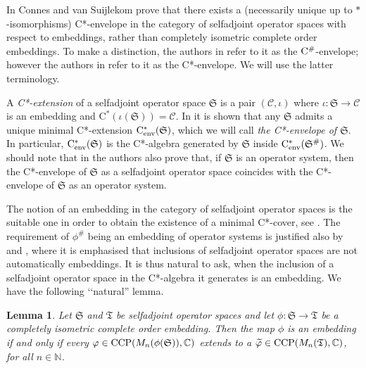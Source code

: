 \documentclass[11pt, draft]{amsart}
\numberwithin{equation}{section}
\theoremstyle{plain}
\newtheorem{lemma}[theorem]{Lemma}
\theoremstyle{definition}
\theoremstyle{remark}
\newcommand{\C}{{\mathcal{C}}}
\def\io{\iota}
\newcommand\vphi{\varphi}
\newcommand{\bC}{\mathbb{C}}
\newcommand{\bN}{\mathbb{N}}
\newcommand{\fS}{{\mathfrak{S}}}
\newcommand{\fT}{{\mathfrak{T}}}
\newcommand{\ca}{\mathrm{C}^*}
\newcommand{\cenv}{\mathrm{C}^*_{\textup{env}}}
\newcommand{\wt}{\widetilde}
\begin{document}
In \cite[Theorem 2.25]{CS21} Connes and van Suijlekom prove that there exists a (necessarily unique up to $*$-isomorphisms) C*-envelope in the category of selfadjoint operator spaces with respect to embeddings, rather than completely isometric complete order embeddings.
To make a distinction, the authors in \cite{CS21} refer to it as the ${\rm C}^{\#}$-envelope; however the authors in \cite{KKM23} refer to it as the C*-envelope.
We will use the latter terminology.

A \emph{C*-extension} of a selfadjoint operator space $\fS$ is a pair $(\C, \io)$ where $\io \colon \fS \to \C$ is an embedding and $\ca(\io(\fS)) = \C$.
In \cite[Lemma 2.22]{CS21} it is shown that any $\fS$ admits a unique minimal C*-extension $\cenv(\fS)$, which we will call \emph{the C*-envelope of $\fS$}.
In particular, $\cenv(\fS)$ is the C*-algebra generated by $\fS$ inside $\cenv(\fS^{\#})$.
We should note that in \cite[Theorem 2.25]{CS21} the authors also prove that, if $\fS$ is an operator system, then the C*-envelope of $\fS$ as a selfadjoint operator space coincides with the C*-envelope of $\fS$ as an operator system.

The notion of an embedding in the category of selfadjoint operator spaces is the suitable one in order to obtain the existence of a minimal C*-cover, see \cite[Remark 2.27]{CS21}. 
The requirement of $\phi^\#$ being an embedding of operator systems is justified also by \cite[Section 4]{Rus23} and \cite[Example 2.14]{KKM23}, where it is emphasised that inclusions of selfadjoint operator spaces are not automatically embeddings.
It is thus natural to ask, when the inclusion of a selfadjoint operator space in the C*-algebra it generates is an embedding.
We have the following \lq\lq natural'' lemma.

\begin{lemma} \label{L:ext}
Let $\fS$ and $\fT$ be selfadjoint operator spaces and let $\phi \colon \fS \to \fT$ be a completely isometric complete order embedding.
Then the map $\phi$ is an embedding if and only if every $\vphi \in {\rm CCP}(M_n(\phi(\fS)), \bC)$ extends to a $\wt{\vphi} \in {\rm CCP}(M_n(\fT), \bC)$, for all $n \in \bN$.
\end{lemma}
\end{document}
